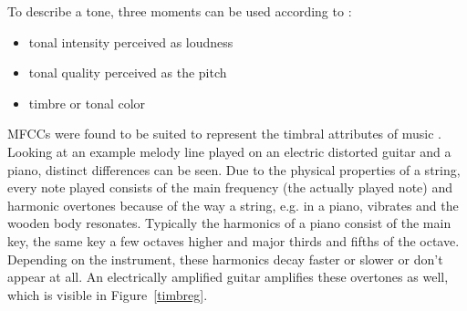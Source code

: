 \FloatBarrier
\noindent To describe a tone, three moments can be used according to \cite[pp. 15]{musicdata}: %
\begin{itemize}
	\setlength\itemsep{-0.5em}
	\item tonal intensity perceived as loudness
	\item tonal quality perceived as the pitch 
	\item timbre or tonal color
\end{itemize}

\noindent MFCCs were found to be suited to represent the timbral attributes of music \cite[p. 55 ff]{knees1}. Looking at an example melody line played on an electric distorted guitar and a piano, distinct differences can be seen. Due to the physical properties of a string, every note played consists of the main frequency (the actually played note) and harmonic overtones because of the way a string, e.g. in a piano, vibrates and the wooden body resonates. Typically the harmonics of a piano consist of the main key, the same key a few octaves higher and major thirds and fifths of the octave. Depending on the instrument, these harmonics decay faster or slower or don't appear at all. An electrically amplified guitar amplifies these overtones as well, which is visible in Figure~\ref{timbreg}.
